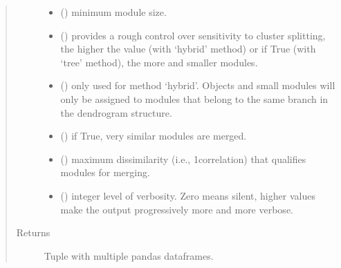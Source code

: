 \documentclass[letterpaper,10pt,english]{sphinxmanual}
\begin{document}
\begin{fulllineitems}
\begin{quote}
\begin{description}
\begin{itemize}
\item {} 
 () \textendash{} minimum module size.

\item {} 
 () \textendash{} provides a rough control over sensitivity to cluster splitting, the higher the value (with ‘hybrid’ method) or if True (with ‘tree’ method), the more and smaller modules.

\item {} 
 () \textendash{} only used for method ‘hybrid’. Objects and small modules will only be assigned to modules that belong to the same branch in the dendrogram structure.

\item {} 
 () \textendash{} if True, very similar modules are merged.

\item {} 
 () \textendash{} maximum dissimilarity (i.e., 1\sphinxhyphen{}correlation) that qualifies modules for merging.

\item {} 
 () \textendash{} integer level of verbosity. Zero means silent, higher values make the output progressively more and more verbose.

\end{itemize}

\item[{Returns}] \leavevmode
Tuple with multiple pandas dataframes.

\end{description}\end{quote}


\end{fulllineitems}
\end{document}
